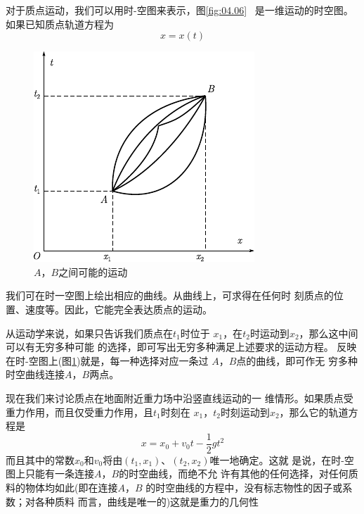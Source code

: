 对于质点运动，我们可以用时-空图来表示，图\ref{fig:04.06}~
是一维运动的时空图。如果已知质点轨道方程为
\begin{equation*}
	x = x ( t )
\end{equation*}
\begin{figure}
	\vspace{-1em}
	\centering
	\includegraphics{figure/fig04.07}
	\caption{$ A $，$ B $之间可能的运动}
	\label{fig:04.07}
\end{figure}
我们可在时一空图上绘出相应的曲线。从曲线上，可求得在任何时
刻质点的位置、速度等。因此，它能完全表达质点的运动。

从运动学来说，如果只告诉我们质点在$ t_1 $时位于
$ x_1 $，在$ t_2 $时运动到$ x_2 $，那么这中间可以有无穷多种可能
的选择，即可写出无穷多种满足上述要求的运动方程。
反映在时-空图上(图\ref{fig:04.07})就是，每一种选择对应一条过
$ A $，$ B $点的曲线，即可作无
穷多种时空曲线连接$ A $，$ B $两点。

现在我们来讨论质点在地面附近重力场中沿竖直线运动的一
维情形。如果质点受重力作用，而且仅受重力作用，且$  t _ { 1 }   $时刻在
$ x _ { 1 }   $，$  t _ { 2 }   $时刻运动到$  x _ { 2 }   $，那么它的轨道方程是
\begin{equation*}
	x = x _ { 0 } + v _ { 0 } t - \frac { 1 } { 2 } g t ^ { 2 }
\end{equation*}
而且其中的常数$ x _ { 0 } $和$  v _ { 0 }  $将由$  ( t _ { 1 }, x _ { 1 } )   $、$  ( t _ { 2 } , x _ { 2 } )   $唯一地确定。这就
是说，在时-空图上只能有一条连接$ A $，$ B $的时空曲线，而绝不允
许有其他的任何选择，对任何质料的物体均如此(即在连接$ A $，$ B $
的时空曲线的方程中，没有标志物性的因子或系数；对各种质料
而言，曲线是唯一的)这就是重力的几何性

